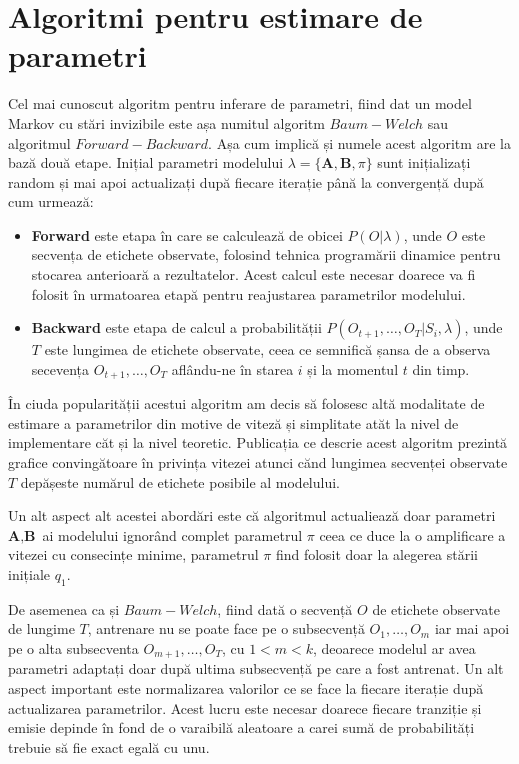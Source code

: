 \section{Algoritmi pentru estimare de parametri}
Cel mai cunoscut algoritm pentru inferare de parametri, fiind dat un model Markov cu stări invizibile este așa numitul algoritm $Baum-Welch$ sau algoritmul $Forward-Backward$. Așa cum implică și numele acest algoritm are la bază două etape. Inițial parametri modelului $\lambda = \{\textbf{A},\textbf{B},\pi\}$ sunt inițializați random și mai apoi actualizați după fiecare iterație până la convergență după cum urmează:
\begin{itemize}
\item{\textbf{Forward} este etapa în care se calculează de obicei $P(O|\lambda)$, unde $O$ este secvența de etichete observate, folosind tehnica programării dinamice pentru stocarea anterioară a rezultatelor. Acest calcul este necesar doarece va fi folosit în urmatoarea etapă pentru reajustarea parametrilor modelului.}
\item{\textbf{Backward} este etapa de calcul a probabilității $P(O_{t+1},\dots,O_{T}| S_{i},\lambda)$, unde $T$ este lungimea de etichete observate, ceea ce semnifică șansa de a observa secevența $O_{t+1},\dots,O_{T}$ aflându-ne în starea $i$ și la momentul $t$ din timp}.
\end{itemize}
\par

În ciuda popularității acestui algoritm am decis să folosesc altă modalitate de estimare a parametrilor din motive de viteză și simplitate atăt la nivel de implementare căt și la nivel teoretic. Publicația ce descrie acest algoritm prezintă grafice convingătoare în privința vitezei atunci cănd lungimea secvenței observate $T$ depășeste numărul de etichete posibile al modelului.\par

Un alt aspect alt acestei abordări este că algoritmul actualiează doar parametri $\textbf{A},\textbf{B}$ ai modelului ignorând complet parametrul $\pi$ ceea ce duce la o amplificare a vitezei cu consecințe minime, parametrul $\pi$  find folosit doar la alegerea stării inițiale $q_{1}$.\par

De asemenea ca și $Baum-Welch$, fiind dată o secvență $O$ de etichete observate de lungime $T$, antrenare nu se poate face pe o subsecvență $O_{1},\dots,O_{m}$ iar mai apoi pe o alta subsecventa $O_{m+1},\dots,O_{T}$, cu $1 < m < k$, deoarece modelul ar avea parametri adaptați doar după ultima subsecvență pe care a fost antrenat. Un alt aspect important este normalizarea valorilor ce se face la fiecare iterație după actualizarea parametrilor. Acest lucru este necesar doarece fiecare tranziție și emisie depinde în fond de o varaibilă aleatoare a carei sumă de probabilități trebuie să fie exact egală cu unu.\par


